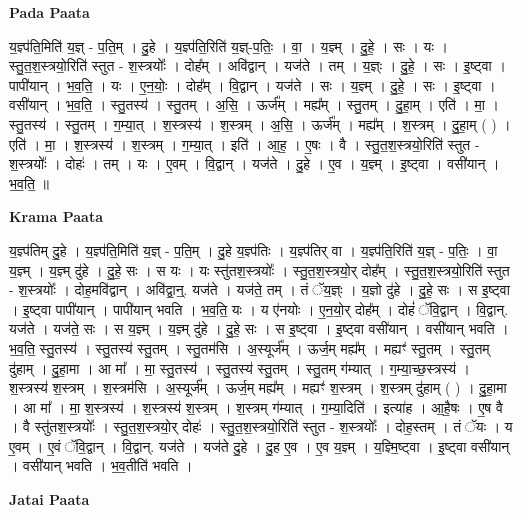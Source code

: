 \documentclass[17pt]{extarticle}
\begin{document}
\textbf{Pada Paata} \newline

य॒ज्ञ्प॑ति॒मिति॑ य॒ज्ञ् - प॒ति॒म् । दु॒हे । य॒ज्ञ्प॑ति॒रिति॑ य॒ज्ञ्-प॒तिः॒ । वा॒ । य॒ज्ञ्म् । दु॒हे॒ । सः । यः । स्तु॒त॒श॒स्त्रयो॒रिति॑ स्तुत - श॒स्त्रयोः᳚ । दोह᳚म् । अवि॑द्वान् । यज॑ते । तम् । य॒ज्ञ्ः । दु॒हे॒ । सः । इ॒ष्ट्वा । पापी॑यान् । भ॒व॒ति॒ । यः । ए॒न॒योः॒ । दोह᳚म् । वि॒द्वान् । यज॑ते । सः । य॒ज्ञ्म् । दु॒हे॒ । सः । इ॒ष्ट्वा । वसी॑यान् । भ॒व॒ति॒ । स्तु॒तस्य॑ । स्तु॒तम् । अ॒सि॒ । ऊर्ज᳚म् । मह्य᳚म् । स्तु॒तम् । दु॒हा॒म् । एति॑ । मा॒ । स्तु॒तस्य॑ । स्तु॒तम् । ग॒म्या॒त् । श॒स्त्रस्य॑ । श॒स्त्रम् । अ॒सि॒ । ऊर्ज᳚म् । मह्य᳚म् । श॒स्त्रम् । दु॒हा॒म् ( ) । एति॑ । मा॒ । श॒स्त्रस्य॑ । श॒स्त्रम् । ग॒म्या॒त् । इति॑ । आ॒ह॒ । ए॒षः । वै । स्तु॒त॒श॒स्त्रयो॒रिति॑ स्तुत - श॒स्त्रयोः᳚ । दोहः॑ । तम् । यः । ए॒वम् । वि॒द्वान् । यज॑ते । दु॒हे । ए॒व । य॒ज्ञ्म् । इ॒ष्ट्वा । वसी॑यान् । भ॒व॒ति॒ ॥  \newline


\textbf{Krama Paata} \newline

य॒ज्ञ्प॑तिम् दु॒हे । य॒ज्ञ्प॑ति॒मिति॑ य॒ज्ञ् - प॒ति॒म् । दु॒हे य॒ज्ञ्प॑तिः । य॒ज्ञ्प॑तिर् वा । य॒ज्ञ्प॑ति॒रिति॑ य॒ज्ञ् - प॒तिः॒ । वा॒ य॒ज्ञ्म् । य॒ज्ञ्म् दु॑हे । दु॒हे॒ सः । स यः । यः स्तु॑तश॒स्त्रयोः᳚ । स्तु॒त॒श॒स्त्रयो॒र् दोह᳚म् । स्तु॒त॒श॒स्त्रयो॒रिति॑ स्तुत - श॒स्त्रयोः᳚ । दोह॒मवि॑द्वान् । अवि॑द्वा॒न्॒. यज॑ते । यज॑ते॒ तम् । तं ॅय॒ज्ञ्ः । य॒ज्ञो दु॑हे । दु॒हे॒ सः । स इ॒ष्ट्वा । इ॒ष्ट्वा पापी॑यान् । पापी॑यान् भवति । भ॒व॒ति॒ यः । य ए॑नयोः । ए॒न॒यो॒र् दोह᳚म् । दोहं॑ ॅवि॒द्वान् । वि॒द्वान्. यज॑ते । यज॑ते॒ सः । स य॒ज्ञ्म् । य॒ज्ञ्म् दु॑हे । दु॒हे॒ सः । स इ॒ष्ट्वा । इ॒ष्ट्वा वसी॑यान् । वसी॑यान् भवति । भ॒व॒ति॒ स्तु॒तस्य॑ । स्तु॒तस्य॑ स्तु॒तम् । स्तु॒तम॑सि । अ॒स्यूर्ज᳚म् । ऊर्ज॒म् मह्य᳚म् । मह्यꣳ॑ स्तु॒तम् । स्तु॒तम् दु॑हाम् । दु॒हा॒मा । आ मा᳚ । मा॒ स्तु॒तस्य॑ । स्तु॒तस्य॑ स्तु॒तम् । स्तु॒तम् ग॑म्यात् । ग॒म्या॒च्छ॒स्त्रस्य॑ । श॒स्त्रस्य॑ श॒स्त्रम् । श॒स्त्रम॑सि । अ॒स्यूर्ज᳚म् । ऊर्ज॒म् मह्य᳚म् । मह्यꣳ॑ श॒स्त्रम् । श॒स्त्रम् दु॑हाम् ( ) । दु॒हा॒मा । आ मा᳚ । मा॒ श॒स्त्रस्य॑ । श॒स्त्रस्य॑ श॒स्त्रम् । श॒स्त्रम् ग॑म्यात् । ग॒म्या॒दिति॑ । इत्या॑ह । आ॒है॒षः । ए॒ष वै । वै स्तु॑तश॒स्त्रयोः᳚ । स्तु॒त॒श॒स्त्रयो॒र् दोहः॑ । स्तु॒त॒श॒स्त्रयो॒रिति॑ स्तुत - श॒स्त्रयोः᳚ । दोह॒स्तम् । तं ॅयः । य ए॒वम् । ए॒वं ॅवि॒द्वान् । वि॒द्वान्. यज॑ते । यज॑ते दु॒हे । दु॒ह ए॒व । ए॒व य॒ज्ञ्म् । य॒ज्ञ्मि॒ष्ट्वा । इ॒ष्ट्वा वसी॑यान् । वसी॑यान् भवति । भ॒व॒तीति॑ भवति । \newline

\textbf{Jatai Paata} \newline
\end{document}
